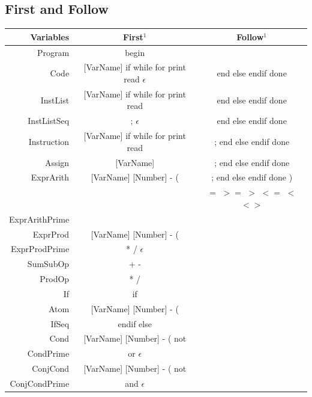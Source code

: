 \documentclass[letterpaper]{article}
\begin{document}
\subsection{First and Follow}
\begin{center}
    \renewcommand{\arraystretch}{1.5}
    \begin{tabular}{| r || c | c |}
        \hline
        \textbf{Variables} & \textbf{First$^1$} & \textbf{Follow$^1$} \\
        \hline
        \hline
        Program & begin & \\
        \hline
        Code & [VarName] if while for print read $\epsilon$ &
        end else endif done \\
        \hline
        InstList & [VarName] if while for print read &
        end else endif done \\
        \hline
        InstListSeq & ; $\epsilon$ &
        end else endif done \\
        \hline
        Instruction & [VarName] if while for print read &
        ; end else endif done \\
        \hline
        Assign & [VarName] &
        ; end else endif done \\
        \hline
        ExprArith & [VarName] [Number] - ( &
        ; end else endif done ) \\
        & & $=$ $>=$ $>$ $<=$ $<$ $<>$ \\
        \hline
        ExprArithPrime & & \\
        \hline
        ExprProd & [VarName] [Number] - ( & \\
        \hline
        ExprProdPrime & * / $\epsilon$ & \\
        \hline
        SumSubOp & + - & \\
        \hline
        ProdOp & * / & \\
        \hline
        If & if & \\
        \hline
        Atom & [VarName] [Number] - ( & \\
        \hline
        IfSeq & endif else & \\
        \hline
        Cond & [VarName] [Number] - ( not & \\
        \hline
        CondPrime & or $\epsilon$ & \\
        \hline
        ConjCond & [VarName] [Number] - ( not & \\
        \hline
        ConjCondPrime & and $\epsilon$ & \\

\end{tabular}
\end{center}
\end{document}
